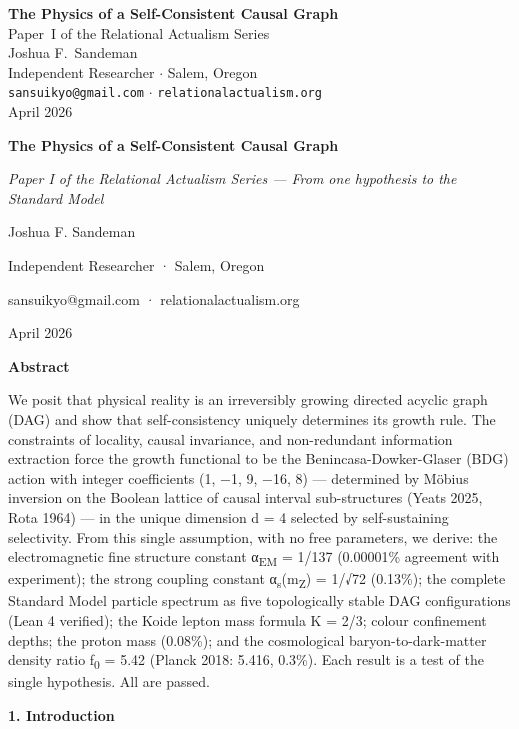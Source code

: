 \documentclass[12pt,a4paper]{article}
\begin{document}
\begin{center}
{\LARGE\bfseries The Physics of a Self-Consistent Causal Graph}\\[18pt]
{\large Paper~I of the Relational Actualism Series}\\[12pt]
{\large Joshua F.\ Sandeman}\\[4pt]
{\small Independent Researcher $\cdot$ Salem, Oregon}\\
{\small\texttt{sansuikyo@gmail.com} $\cdot$ \texttt{relationalactualism.org}}\\[6pt]
{\small April 2026}
\end{center}
\vspace{1em}

\textbf{The Physics of a Self-Consistent Causal Graph}

\emph{Paper I of the Relational Actualism Series --- From one hypothesis
to the Standard Model}

Joshua F. Sandeman

Independent Researcher · Salem, Oregon

sansuikyo@gmail.com · relationalactualism.org

April 2026

\textbf{Abstract}

We posit that physical reality is an irreversibly growing directed
acyclic graph (DAG) and show that self-consistency uniquely determines
its growth rule. The constraints of locality, causal invariance, and
non-redundant information extraction force the growth functional to be
the Benincasa-Dowker-Glaser (BDG) action with integer coefficients (1,
−1, 9, −16, 8) --- determined by Möbius inversion on the Boolean lattice
of causal interval sub-structures (Yeats 2025, Rota 1964) --- in the
unique dimension d = 4 selected by self-sustaining selectivity. From
this single assumption, with no free parameters, we derive: the
electromagnetic fine structure constant α\textsubscript{EM} = 1/137
(0.00001\% agreement with experiment); the strong coupling constant
α\textsubscript{s}(m\textsubscript{Z}) = 1/√72 (0.13\%); the complete
Standard Model particle spectrum as five topologically stable DAG
configurations (Lean 4 verified); the Koide lepton mass formula K = 2/3;
colour confinement depths; the proton mass (0.08\%); and the
cosmological baryon-to-dark-matter density ratio f\textsubscript{0} =
5.42 (Planck 2018: 5.416, 0.3\%). Each result is a test of the single
hypothesis. All are passed.

\textbf{1. Introduction}
\end{document}
